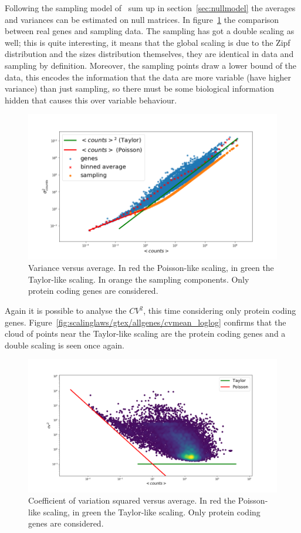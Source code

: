 Following the sampling model of~\cite{Mazzolini2018} sum up in section~\ref{sec:nullmodel} the averages and variances can be estimated on null matrices. In figure~\ref{fig:scalinglaws/gtex/varmean_3sigma} the comparison between real genes and sampling data. The sampling has got a double scaling as well; this is quite interesting, it means that the global scaling is due to the Zipf distribution and the sizes distribution themselves, they are identical in data and sampling by definition.
Moreover, the sampling points draw a lower bound of the data, this encodes the information that the data are more variable (have higher variance) than just sampling, so there must be some biological information hidden that causes this over variable behaviour.
\begin{figure}[H]
    \centering
    \includegraphics[width=0.8\linewidth]{pictures/scalinglaws/gtex/varmean_3sigma.png}
    \caption{Variance versus average. In \textcolor{pythonred}{red} the Poisson-like scaling, in \textcolor{pythongreen}{green} the Taylor-like scaling. In \textcolor{pythonorange}{orange} the sampling components. Only protein coding genes are considered.}
    \label{fig:scalinglaws/gtex/varmean_3sigma}
\end{figure}

Again it is possible to analyse the $CV^2$, this time considering only protein coding genes. Figure~\ref{fig:scalinglaws/gtex/allgenes/cvmean_loglog} confirms that the cloud of points near the Taylor-like scaling are the protein coding genes and a double scaling is seen once again.
\begin{figure}[htb!]
    \centering
    \includegraphics[width=0.9\linewidth]{pictures/scalinglaws/gtex/cvmean_loglog_density.png}
    \caption{Coefficient of variation squared versus average. In \textcolor{pythonred}{red} the Poisson-like scaling, in \textcolor{pythongreen}{green} the Taylor-like scaling. Only protein coding genes are considered.}
    \label{fig:scalinglaws/gtex/cvmean_loglog}
\end{figure}

